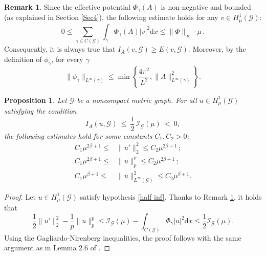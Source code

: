\documentclass[12pt,a4paper]{amsart}
\theoremstyle{definition}
\newtheorem{remark}[definition]{Remark}
\theoremstyle{plain}
\newtheorem{proposition}[definition]{Proposition}
\numberwithin{equation}{section}
\begin{document}
\begin{remark} \label{phiestimate}
Since the effective potential $\Phi_\gamma(A)$ is non-negative and bounded (as explained in Section \ref{Sec4}), the following estimate holds for any $v \in H^1_\mu(\mathcal{G})$:
\begin{equation}
    0 \leq \sum_{\gamma \in C(\mathcal{G})}  \int_{\gamma}\Phi_{\gamma}(A) |v|^2 \mathrm{d}x \leq \|\Phi\|_{\infty} \cdot \mu \,.
\end{equation}
Consequently, it is always true that $I_A (v, \mathcal{G}) \geq E(v, \mathcal{G})$.
Moreover, by the definition of $\phi_\gamma$, for every $\gamma$
\begin{equation}
    \|\phi_{\gamma}\|_{L^\infty(\gamma)} \leq \min \left\{  \frac{4 \pi^2}{L^2}, \|A\|^2_{L^\infty(\gamma)} \right\}.
\end{equation}
\end{remark}
\begin{proposition} \label{estimates}
Let $\mathcal{G}$ be a noncompact metric graph.
For all $u \in H^1_{\mu}(\mathcal{G})$ satisfying the condition
\begin{equation}
    I_A(u, \mathcal{G}) \ \leq \ \frac{1}{2} \, \mathcal{I}_{\mathcal{G}} (\mu) \ < \ 0,
    \label{half inf}
\end{equation}
the following estimates hold for some constants $C_1, C_2 > 0$:
\begin{align} \label{largemu}
     C_1 \mu^{2 \beta +1} \leq &  \|u'\|_2^2 \leq C_2 \mu^{2 \beta + 1 }\,; \\
    C_1 \mu^{2 \beta +1} \leq & \|u\|^p_p  \leq C_2 \mu^{2 \beta +1}\,; \\
    C_1 \mu^{\beta +1} \leq  & \|u\|^2_{L^{\infty}(\mathcal{G})} \leq  C_2 \mu^{\beta +1}.
 \end{align}
\end{proposition}

\begin{proof}
Let $u \in H^1_{\mu}(\mathcal{G})$ satisfy hypothesis \eqref{half inf}. Thanks to Remark \ref{phiestimate}, it holds that
\begin{equation}
    \frac{1}{2} \|u'\|^2_2 - \frac{1}{p} \|u\|_p^p \leq \mathcal{I}_{\mathcal{G}} (\mu) - \int_{C(\mathcal{G})} \Phi_\gamma |u|^2 \mathrm{d}x \leq \frac{1}{2} \mathcal{I}_{\mathcal{G}}(\mu).
\end{equation}
Using the Gagliardo-Nirenberg inequalities, the proof follows with the same argument as in Lemma 2.6 of \cite{Adami2016}.
\end{proof} 
\end{document}
